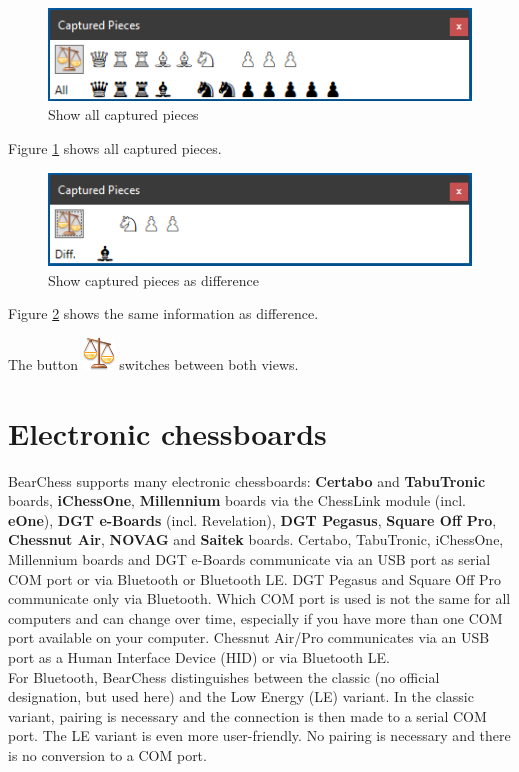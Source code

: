\documentclass[11pt,a4paper]{article}
\begin{document}
\begin{figure}[H]
	\centering
	\includegraphics[scale=1.0]{CapturedPieces3.png}
	\caption{Show all captured pieces }
	\label{fig:CapturedPieces3}
\end{figure}

Figure \ref{fig:CapturedPieces3} shows all captured pieces.

\begin{figure}[H]
	\centering
	\includegraphics[scale=1.0]{CapturedPieces4.png}
	\caption{Show captured pieces as difference}
	\label{fig:CapturedPieces4}
\end{figure}
Figure \ref{fig:CapturedPieces4} shows the same information as difference.

The button \includegraphics[scale=0.5]{balance_unbalance.png} switches between both views.


\section{Electronic chessboards} \label{ElectronicChessBoard}
BearChess supports many electronic chessboards: \textbf{Certabo} and \textbf{TabuTronic}  boards, \textbf{iChessOne}, \textbf{Millennium} boards via the ChessLink module (incl. \textbf{eOne}), \textbf{DGT e-Boards} (incl. Revelation), \textbf{DGT Pegasus}, \textbf{Square Off Pro}, \textbf{Chessnut Air}, \textbf{NOVAG} and \textbf{Saitek} boards. Certabo, TabuTronic, iChessOne, Millennium boards and DGT e-Boards communicate via an USB port as serial COM port or via Bluetooth or Bluetooth LE. DGT Pegasus and Square Off Pro communicate only via Bluetooth. Which COM port is used is not the same for all computers and can change over time, especially if you have more than one COM port available on your computer. Chessnut Air/Pro communicates via an USB port as a Human Interface Device (HID) or via Bluetooth LE.\\ 
For Bluetooth, BearChess distinguishes between the classic (no official designation, but used here) and the Low Energy (LE) variant.
In the classic variant, pairing is necessary and the connection is then made to a serial COM port. The LE variant is even more user-friendly. No pairing is necessary and there is no conversion to a COM port.
\end{document}
